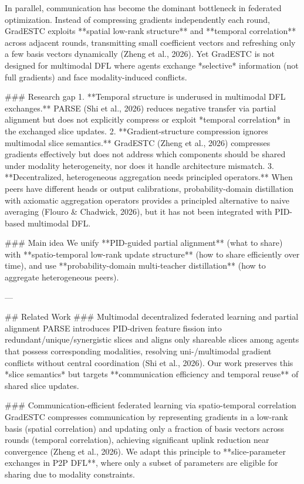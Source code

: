 In parallel, communication has become the dominant bottleneck in federated optimization. Instead of compressing gradients independently each round, GradESTC exploits **spatial low-rank structure** and **temporal correlation** across adjacent rounds, transmitting small coefficient vectors and refreshing only a few basis vectors dynamically (Zheng et al., 2026). Yet GradESTC is not designed for multimodal DFL where agents exchange *selective* information (not full gradients) and face modality-induced conflicts.

### Research gap  
1. **Temporal structure is underused in multimodal DFL exchanges.** PARSE (Shi et al., 2026) reduces negative transfer via partial alignment but does not explicitly compress or exploit *temporal correlation* in the exchanged slice updates.  
2. **Gradient-structure compression ignores multimodal slice semantics.** GradESTC (Zheng et al., 2026) compresses gradients effectively but does not address which components should be shared under modality heterogeneity, nor does it handle architecture mismatch.  
3. **Decentralized, heterogeneous aggregation needs principled operators.** When peers have different heads or output calibrations, probability-domain distillation with axiomatic aggregation operators provides a principled alternative to naive averaging (Flouro & Chadwick, 2026), but it has not been integrated with PID-based multimodal DFL.

### Main idea  
We unify **PID-guided partial alignment** (what to share) with **spatio-temporal low-rank update structure** (how to share efficiently over time), and use **probability-domain multi-teacher distillation** (how to aggregate heterogeneous peers).

---

## Related Work  
### Multimodal decentralized federated learning and partial alignment  
PARSE introduces PID-driven feature fission into redundant/unique/synergistic slices and aligns only shareable slices among agents that possess corresponding modalities, resolving uni-/multimodal gradient conflicts without central coordination (Shi et al., 2026). Our work preserves this *slice semantics* but targets **communication efficiency and temporal reuse** of shared slice updates.

### Communication-efficient federated learning via spatio-temporal correlation  
GradESTC compresses communication by representing gradients in a low-rank basis (spatial correlation) and updating only a fraction of basis vectors across rounds (temporal correlation), achieving significant uplink reduction near convergence (Zheng et al., 2026). We adapt this principle to **slice-parameter exchanges in P2P DFL**, where only a subset of parameters are eligible for sharing due to modality constraints.

